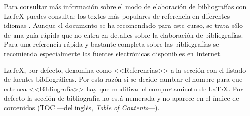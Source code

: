 \documentclass[11pt,a4paper]{article}
\begin{document}
Para consultar más información sobre el modo de elaboración de bibliografías con \LaTeX{} puedes consultar los textos más populares de referencia en diferentes idiomas \cite[en inglés]{KopDal2003,Lam1994,MitGooBra2004} \cite[en español]{CasLucMir2000,CasLucMir2003}. Aunque el documento \cite{lshort2009} se ha recomendado para este curso, se trata sólo de una guía rápida que no entra en detalles sobre la elaboración de bibliografías. Para una referencia rápida y bastante completa sobre las bibliografías se recomienda especialmente las fuentes electrónicas \cite{Rob2010,wiki2010} disponibles en Internet.

\LaTeX{}, por defecto, denomina como <<Referencias>> a la sección con el listado de fuentes bibliográficas. Por esta razón si se decide cambiar el nombre para que este sea <<Bibliografía>> hay que modificar el comportamiento de \LaTeX. Por defecto la sección de bibliografía no está numerada y no aparece en el índice de contenidos (TOC ---del inglés, \emph{Table of Contents}---).


\renewcommand{\refname}{Bibliografía} %


\end{document}
